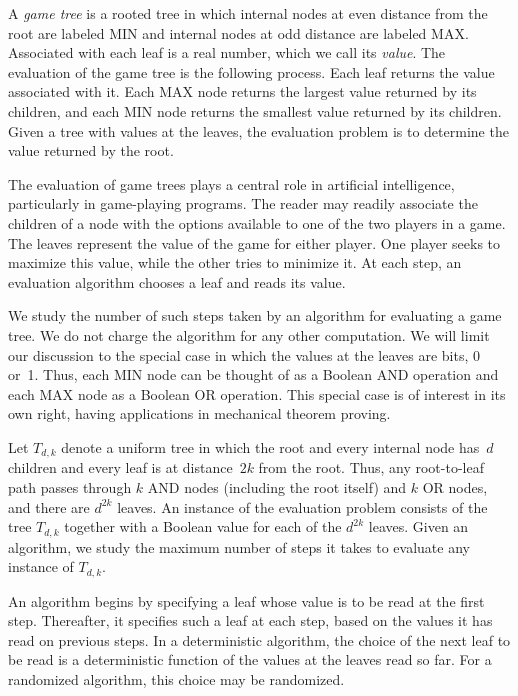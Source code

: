 \documentclass[twoside,12pt]{book}
\theoremstyle{plain}
\theoremstyle{definition}
\theoremstyle{remark}
\begin{document}
A \emph{game tree} is a rooted tree in which internal nodes at even distance
from the root are labeled MIN and internal nodes at odd distance are labeled
MAX.  Associated with each leaf is a real number, which we call its
\emph{value}.  The evaluation of the game tree is the following process.
Each leaf returns the value associated with it.  Each MAX node returns the
largest value returned by its children, and each MIN node returns the smallest
value returned by its children.  Given a tree with values at the leaves, the
evaluation problem is to determine the value returned by the root.

The evaluation of game trees plays a central role in artificial intelligence,
particularly in game-playing programs.  The reader may readily associate the
children of a node with the options available to one of the two players in a
game.  The leaves represent the value of the game for either player.  One
player seeks to maximize this value, while the other tries to minimize it.
At each step, an evaluation algorithm chooses a leaf and reads its value.

We study the number of such steps taken by an algorithm for evaluating a game
tree.  We do not charge the algorithm for any other computation.  We will
limit our discussion to the special case in which the values at the leaves are
bits, 0 or~1.  Thus, each MIN node can be thought of as a Boolean AND
operation and each MAX node as a Boolean OR operation.  This special case is
of interest in its own right, having applications in mechanical theorem
proving.

Let $T_{d,k}$ denote a uniform tree in which the root and every internal node
has~$d$ children and every leaf is at distance~$2k$ from the root.  Thus, any
root-to-leaf path passes through $k$ AND nodes (including the root itself)
and $k$ OR nodes, and there are $d^{2k}$ leaves.  An instance of the
evaluation problem consists of the tree $T_{d,k}$ together with a Boolean
value for each of the $d^{2k}$ leaves.  Given an algorithm, we study the
maximum number of steps it takes to evaluate any instance of $T_{d,k}$.

An algorithm begins by specifying a leaf whose value is to be read at the
first step.  Thereafter, it specifies such a leaf at each step, based on the
values it has read on previous steps.  In a deterministic algorithm, the
choice of the next leaf to be read is a deterministic function of the values
at the leaves read so far.  For a randomized algorithm, this choice may be
randomized.
\end{document}
